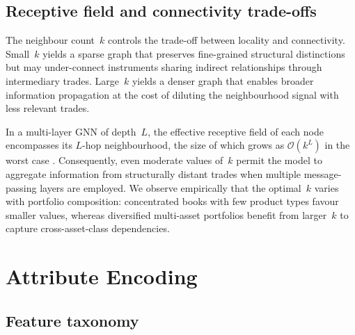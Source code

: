 \documentclass[11pt,a4paper]{article}
\begin{document}
\subsection{Receptive field and connectivity trade-offs}%
\label{sec:graph:properties}

The neighbour count~$k$ controls the trade-off between locality and
connectivity.  Small~$k$ yields a sparse graph that preserves fine-grained
structural distinctions but may under-connect instruments sharing indirect
relationships through intermediary trades.  Large~$k$ yields a denser graph
that enables broader information propagation at the cost of diluting the
neighbourhood signal with less relevant trades.

In a multi-layer GNN of depth~$L$, the effective receptive field of each node
encompasses its $L$-hop neighbourhood, the size of which grows as
$\mathcal{O}(k^L)$ in the worst case \cite{xu2019powerful,alon2021bottleneck}.
Consequently, even moderate values of~$k$ permit the model to aggregate
information from structurally distant trades when multiple message-passing
layers are employed.  We observe empirically that the optimal~$k$ varies with
portfolio composition: concentrated books with few product types favour smaller
values, whereas diversified multi-asset portfolios benefit from larger~$k$ to
capture cross-asset-class dependencies.


\section{Attribute Encoding}\label{sec:attributes}

\subsection{Feature taxonomy}\label{sec:attributes:taxonomy}
\end{document}
